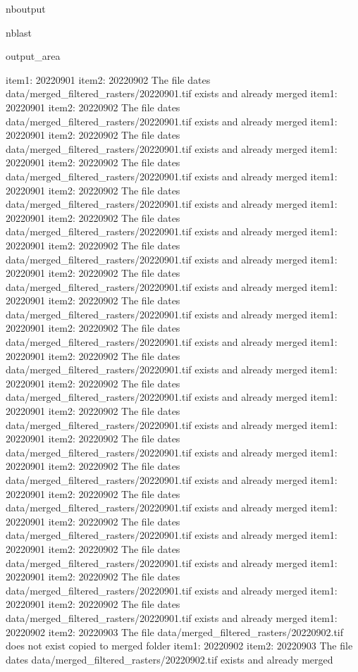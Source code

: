 \documentclass[letterpaper,10pt]{sphinxmanual}
\begin{document}
\begin{sphinxuseclass}{nboutput}
\begin{sphinxuseclass}{nblast}
{\begin{sphinxuseclass}{output_area}
\begin{sphinxuseclass}{}
\begin{sphinxVerbatim}[commandchars=\\\{\}]
item1:  20220901
item2:  20220902
The file dates data/merged\_filtered\_rasters/20220901.tif exists and already merged
item1:  20220901
item2:  20220902
The file dates data/merged\_filtered\_rasters/20220901.tif exists and already merged
item1:  20220901
item2:  20220902
The file dates data/merged\_filtered\_rasters/20220901.tif exists and already merged
item1:  20220901
item2:  20220902
The file dates data/merged\_filtered\_rasters/20220901.tif exists and already merged
item1:  20220901
item2:  20220902
The file dates data/merged\_filtered\_rasters/20220901.tif exists and already merged
item1:  20220901
item2:  20220902
The file dates data/merged\_filtered\_rasters/20220901.tif exists and already merged
item1:  20220901
item2:  20220902
The file dates data/merged\_filtered\_rasters/20220901.tif exists and already merged
item1:  20220901
item2:  20220902
The file dates data/merged\_filtered\_rasters/20220901.tif exists and already merged
item1:  20220901
item2:  20220902
The file dates data/merged\_filtered\_rasters/20220901.tif exists and already merged
item1:  20220901
item2:  20220902
The file dates data/merged\_filtered\_rasters/20220901.tif exists and already merged
item1:  20220901
item2:  20220902
The file dates data/merged\_filtered\_rasters/20220901.tif exists and already merged
item1:  20220901
item2:  20220902
The file dates data/merged\_filtered\_rasters/20220901.tif exists and already merged
item1:  20220901
item2:  20220902
The file dates data/merged\_filtered\_rasters/20220901.tif exists and already merged
item1:  20220901
item2:  20220902
The file dates data/merged\_filtered\_rasters/20220901.tif exists and already merged
item1:  20220901
item2:  20220902
The file dates data/merged\_filtered\_rasters/20220901.tif exists and already merged
item1:  20220901
item2:  20220902
The file dates data/merged\_filtered\_rasters/20220901.tif exists and already merged
item1:  20220901
item2:  20220902
The file dates data/merged\_filtered\_rasters/20220901.tif exists and already merged
item1:  20220901
item2:  20220902
The file dates data/merged\_filtered\_rasters/20220901.tif exists and already merged
item1:  20220901
item2:  20220902
The file dates data/merged\_filtered\_rasters/20220901.tif exists and already merged
item1:  20220901
item2:  20220902
The file dates data/merged\_filtered\_rasters/20220901.tif exists and already merged
item1:  20220902
item2:  20220903
The file data/merged\_filtered\_rasters/20220902.tif does not exist copied to merged folder
item1:  20220902
item2:  20220903
The file dates data/merged\_filtered\_rasters/20220902.tif exists and already merged

\end{sphinxVerbatim}
\end{sphinxuseclass}
\end{sphinxuseclass}}
\end{sphinxuseclass}
\end{sphinxuseclass}
\end{document}

